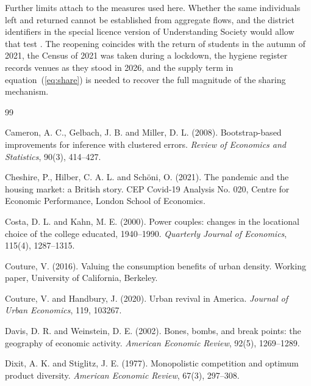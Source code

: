 \documentclass[11pt,a4paper]{article}
\begin{document}
Further limits attach to the measures used here. Whether the same individuals left and returned cannot be established from aggregate flows, and the district identifiers in the special licence version of Understanding Society would allow that test \citep{iser2025usoc}. The reopening coincides with the return of students in the autumn of 2021, the Census of 2021 was taken during a lockdown, the hygiene register records venues as they stood in 2026, and the supply term in equation~(\ref{eq:share}) is needed to recover the full magnitude of the sharing mechanism.

\raggedright
\begin{thebibliography}{99}

Cameron, A. C., Gelbach, J. B. and Miller, D. L. (2008). Bootstrap-based improvements for inference with clustered errors. \textit{Review of Economics and Statistics}, 90(3), 414--427.

Cheshire, P., Hilber, C. A. L. and Sch{\"o}ni, O. (2021). The pandemic and the housing market: a British story. CEP Covid-19 Analysis No. 020, Centre for Economic Performance, London School of Economics.

Costa, D. L. and Kahn, M. E. (2000). Power couples: changes in the locational choice of the college educated, 1940--1990. \textit{Quarterly Journal of Economics}, 115(4), 1287--1315.

Couture, V. (2016). Valuing the consumption benefits of urban density. Working paper, University of California, Berkeley.

Couture, V. and Handbury, J. (2020). Urban revival in America. \textit{Journal of Urban Economics}, 119, 103267.

Davis, D. R. and Weinstein, D. E. (2002). Bones, bombs, and break points: the geography of economic activity. \textit{American Economic Review}, 92(5), 1269--1289.

Dixit, A. K. and Stiglitz, J. E. (1977). Monopolistic competition and optimum product diversity. \textit{American Economic Review}, 67(3), 297--308.


\end{thebibliography}
\end{document}

